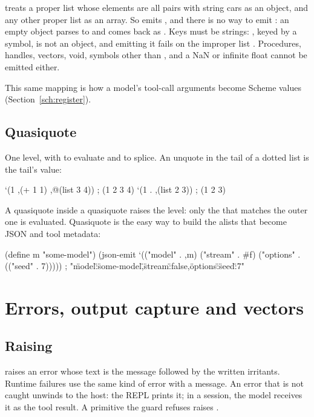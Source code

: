  treats a proper list whose elements are all pairs with
string cars as an object, and any other proper list as an array. So
 emits \code{[]}, and there is no way to emit \code{\{\}}: an empty
object parses to \code{()} and comes back as \code{[]}. Keys must be
strings: , keyed by a symbol, is not an object, and emitting
it fails on the improper list . Procedures, handles, vectors,
void, symbols other than , and a NaN or infinite float cannot be
emitted either.

This same mapping is how a model's tool-call arguments become Scheme values
(Section~\ref{sch:register}).

\section{Quasiquote}

One level, with \code{,} to evaluate and  to splice. An unquote in
the tail of a dotted list is the tail's value:

\begin{scm}
`(1 ,(+ 1 1) ,@(list 3 4))   ; (1 2 3 4)
`(1 . ,(list 2 3))           ; (1 2 3)
\end{scm}

\begin{sloppypar}
A quasiquote inside a quasiquote raises the level: only the
 that matches the outer one is evaluated. Quasiquote is the easy way to build the alists that become JSON
and tool metadata:
\end{sloppypar}

\begin{scm}
(define m "some-model")
(json-emit `(("model" . ,m) ("stream" . #f) ("options" . (("seed" . 7)))))
; "{\"model\":\"some-model\",\"stream\":false,\"options\":{\"seed\":7}}"
\end{scm}

\chapter{Errors, output capture and vectors}

\section{Raising}

 raises an error whose text is the
message followed by the written irritants. Runtime failures use the same
kind of error with a  message. An error that is not caught
unwinds to the host: the REPL prints it; in a session, the model receives it
as the tool result. A primitive the guard refuses raises
.

